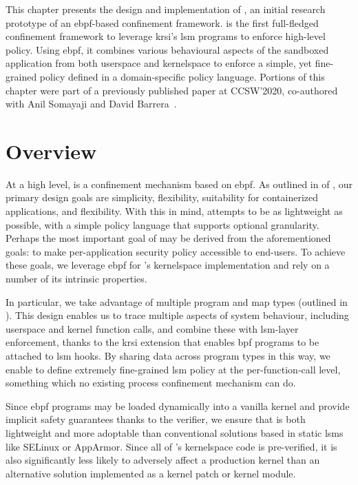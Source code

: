 This chapter presents the design and implementation of \bpfbox{}, an initial research
prototype of an \gls{ebpf}-based confinement framework. \bpfbox{} is the first
full-fledged confinement framework to leverage \gls{krsi}'s \gls{lsm} programs to enforce
high-level policy. Using \gls{ebpf}, it combines various behavioural aspects of the
sandboxed application from both userspace and kernelspace to enforce a simple, yet
fine-grained policy defined in a domain-specific policy language. Portions of this chapter
were part of a previously published paper at CCSW'2020, co-authored with Anil Somayaji and
David Barrera~\cite{findlay2020_bpfbox}.



\section{\bpfbox{} Overview}

At a high level, \bpfbox{} is a confinement mechanism based on \gls{ebpf}. As outlined in
 of , our primary design goals are
simplicity, flexibility, suitability for containerized applications, and flexibility. With
this in mind, \bpfbox{} attempts to be as lightweight as possible, with a simple policy
language that supports optional granularity. Perhaps the most important goal of \bpfbox{}
may be derived from the aforementioned goals: to make per-application security policy
accessible to end-users. To achieve these goals, we leverage \gls{ebpf} for \bpfbox{}'s
kernelspace implementation and rely on a number of its intrinsic properties.

In particular, we take advantage of multiple program and map types (outlined in
). This design enables us to trace multiple aspects of system
behaviour, including userspace and kernel function calls, and combine these with
\gls{lsm}-layer enforcement, thanks to the \gls{krsi} extension that enables \gls{bpf}
programs to be attached to \gls{lsm} hooks. By sharing data across program types in this
way, we enable \bpfbox{} to define extremely fine-grained \gls{lsm} policy at the
per-function-call level, something which no existing process confinement mechanism can do.

Since \gls{ebpf} programs may be loaded dynamically into a vanilla kernel and provide
implicit safety guarantees thanks to the verifier, we ensure that \bpfbox{} is both
lightweight and more adoptable than conventional solutions based in static \glspl{lsm}
like SELinux or AppArmor. Since all of \bpfbox{}'s kernelspace code is pre-verified, it is
also significantly less likely to adversely affect a production kernel than an alternative
solution implemented as a kernel patch or kernel module.

